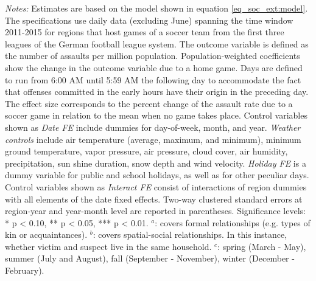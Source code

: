 \begin{table}[ht]
\begin{threeparttable}
\begin{tablenotes}
			\item \scriptsize \emph{Notes:} Estimates are based on the model shown in equation \ref{eq_soc_ext:model}. The specifications use daily data (excluding June) spanning the time window 2011-2015 for regions that host games of a soccer team from the first three leagues of the German football league system. The outcome variable is defined as the number of assaults per million population. Population-weighted coefficients show the change in the outcome variable due to a home game. Days are defined to run from 6:00 AM until 5:59 AM the following day to accommodate the fact that offenses committed in the early hours have their origin in the preceding day. The effect size corresponds to the percent change of the assault rate due to a soccer game in relation to the mean when no game takes place. Control variables shown as \textit{Date FE} include dummies for day-of-week, month, and year. \textit{Weather controls} include air temperature (average, maximum, and minimum), minimum ground temperature, vapor pressure, air pressure, cloud cover, air humidity, precipitation, sun shine duration, snow depth and wind velocity. \textit{Holiday FE} is a dummy variable for public and school holidays, as well as for other peculiar days. Control variables shown as \textit{Interact FE} consist of interactions of region dummies with all elements of the date fixed effects. Two-way clustered standard errors at region-year and year-month level are reported in parentheses. \newline Significance levels: * p < 0.10, ** p < 0.05, *** p < 0.01.\newline \hspace*{15pt} $^a$: covers formal relationships (e.g. types of kin or acquaintances). \newline \hspace*{15pt} $^b$: covers spatial-social relationships. In this instance, whether victim and suspect live in the same household.\newline \hspace*{15pt} $^c$: spring (March - May), summer (July and August), fall (September - November), winter (December - February).
		\end{tablenotes} 
	\end{threeparttable} 
\end{table}